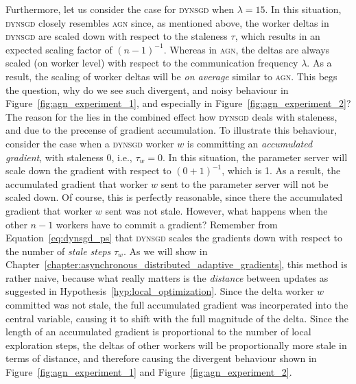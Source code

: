 Furthermore, let us consider the case for \textsc{dynsgd} when $\lambda = 15$. In this situation, \textsc{dynsgd} closely resembles \textsc{agn} since, as mentioned above, the worker deltas in \textsc{dynsgd} are scaled down with respect to the staleness $\tau$, which results in an expected scaling factor of $(n - 1)^{-1}$. Whereas in \textsc{agn}, the deltas are always scaled (on worker level) with respect to the communication frequency $\lambda$. As a result, the scaling of worker deltas will be \emph{on average} similar to \textsc{agn}. This begs the question, why do we see such divergent, and noisy behaviour in Figure~\ref{fig:agn_experiment_1}, and especially in Figure~\ref{fig:agn_experiment_2}? The reason for the lies in the combined effect how \textsc{dynsgd} deals with staleness, and due to the precense of gradient accumulation. To illustrate this behaviour, consider the case when a \textsc{dynsgd} worker $w$ is committing an \emph{accumulated gradient}, with staleness 0, i.e., $\tau_w = 0$. In this situation, the parameter server will scale down the gradient with respect to $(0 + 1)^{-1}$, which is 1. As a result, the accumulated gradient that worker $w$ sent to the parameter server will not be scaled down. Of course, this is perfectly reasonable, since there the accumulated gradient that worker $w$ sent was not stale. However, what happens when the other $n - 1$ workers have to commit a gradient? Remember from Equation~\ref{eq:dynsgd_ps} that \textsc{dynsgd} scales the gradients down with respect to the number of \emph{stale steps} $\tau_w$. As we will show in Chapter~\ref{chapter:asynchronous_distributed_adaptive_gradients}, this method is rather naive, because what really matters is the \emph{distance} between updates as suggested in Hypothesis~\ref{hyp:local_optimization}. Since the delta worker $w$ committed was not stale, the full accumulated gradient was incorperated into the central variable, causing it to shift with the full magnitude of the delta. Since the length of an accumulated gradient is proportional to the number of local exploration steps, the deltas of other workers will be proportionally more stale in terms of distance, and therefore causing the divergent behaviour shown in Figure~\ref{fig:agn_experiment_1} and Figure~\ref{fig:agn_experiment_2}.

